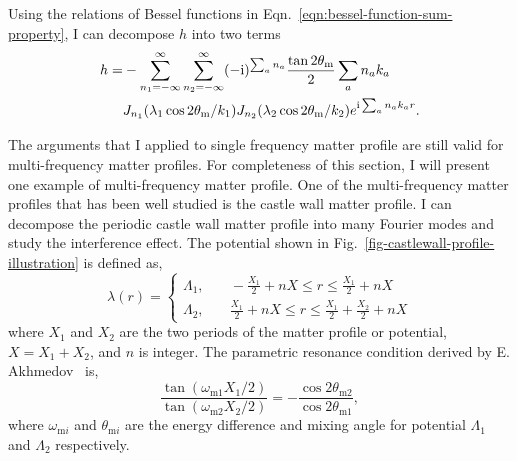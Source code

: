 
Using the relations of Bessel functions in Eqn.~\ref{eqn:bessel-function-sum-property}, I can decompose $h$ into two terms
\begin{align}
    h =& -\sum_{n_1 = -\infty}^\infty \sum_{n_2 = -\infty}^\infty  (-\mathrm{i})^{ \sum_a n_a} \frac{\tan 2\theta_\mathrm m}{2} \sum_a n_a k_a \\
    & J_{n_1} ( \lambda_1 \cos 2\theta_\mathrm m/k_1)  J_{n_2} ( \lambda_2 \cos 2\theta_\mathrm m/k_2)  e^{  \mathrm{i} \sum_a n_a k_a r } .
\end{align}

The arguments that I applied to single frequency matter profile are still valid for multi-frequency matter profiles. For completeness of this section, I will present one example of multi-frequency matter profile. One of the multi-frequency matter profiles that has been well studied is the castle wall matter profile. I can decompose the periodic castle wall matter profile into many Fourier modes and study the interference effect. The potential shown in Fig.~\ref{fig-castlewall-profile-illustration} is defined as,
\begin{equation}
    \lambda(r) = \begin{cases}
\Lambda_1, &\quad -\frac{X_1}{2}+nX\le r\le \frac{X_1}{2}+nX \\
\Lambda_2, &\quad \frac{X_1}{2}+nX\le r\le \frac{X_1}{2}+\frac{X_2}{2} +nX
\end{cases}
\label{eq-castle-wall-potential}
\end{equation}
where $X_1$ and $X_2$ are the two periods of the matter profile or potential, $X=X_1+X_2$, and $n$ is integer. The parametric resonance condition derived by E. Akhmedov~\cite{Akhmedov2000} is,
\begin{equation}
    \frac{\tan (\omega_{\mathrm m1}X_1/2)}{\tan (\omega_{\mathrm m2}X_2/2)} = - \frac{\cos 2\theta_{\mathrm m2}}{\cos 2\theta_{\mathrm m1}},
    \label{eq-akhmedov-resonance-condition-castle-wall}
\end{equation}
where $\omega_{\mathrm{m}i}$ and $\theta_{\mathrm{m}i}$ are the energy difference and mixing angle for potential $\Lambda_1$ and $\Lambda_2$ respectively.

